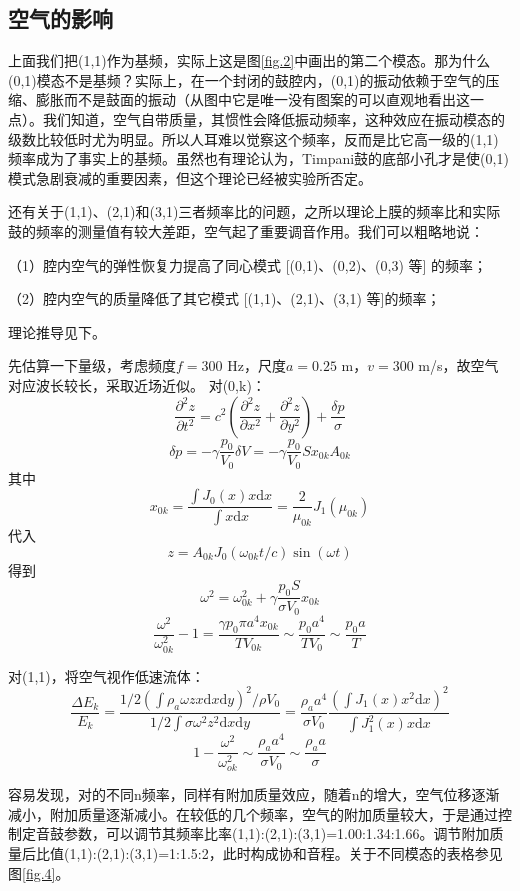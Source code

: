 \subsection{空气的影响}
上面我们把(1,1)作为基频，实际上这是图\ref{fig.2}中画出的第二个模态。那为什么(0,1)模态不是基频？实际上，在一个封闭的鼓腔内，(0,1)的振动依赖于空气的压缩、膨胀而不是鼓面的振动（从图中它是唯一没有图案的可以直观地看出这一点）。我们知道，空气自带质量，其惯性会降低振动频率，这种效应在振动模态的级数比较低时尤为明显。所以人耳难以觉察这个频率，反而是比它高一级的(1,1)频率成为了事实上的基频。虽然也有理论认为，Timpani鼓的底部小孔才是使(0,1)模式急剧衰减的重要因素，但这个理论已经被实验所否定。

还有关于(1,1)、(2,1)和(3,1)三者频率比的问题，之所以理论上膜的频率比和实际鼓的频率的测量值有较大差距，空气起了重要调音作用。我们可以粗略地说：

（1）腔内空气的弹性恢复力提高了同心模式 [(0,1)、(0,2)、(0,3) 等] 的频率；

（2）腔内空气的质量降低了其它模式 [(1,1)、(2,1)、(3,1) 等]的频率；

理论推导见下。

先估算一下量级，考虑频度$f=300$ Hz，尺度$a=0.25$ m，$v=300$ m/s，故空气对应波长较长，采取近场近似。
对(0,k)：
$$\frac{\partial^2 z}{\partial t^2}=c^2\left(\frac{\partial^2 z}{\partial x^2}+\frac{\partial^2 z}{\partial y^2}\right)+\frac{\delta p}{\sigma}$$
$$\delta p=-\gamma \frac{p_0}{V_0} \delta V=-\gamma \frac{p_0}{V_0} S x_{0 k} A_{0 k}$$
其中
$$x_{0 k}=\frac{\int J_0(x) x\text{d}x}{\int x\text{d}x}=\frac{2}{\mu_{0 k}} J_1\left(\mu_{0 k}\right)$$
代入
$$z=A_{0 k} J_0\left(\omega_{0 k} t / c\right) \sin (\omega t)$$
得到
$$\omega^2=\omega_{0 k}^2+\gamma \frac{p_0 S}{\sigma V_0} x_{0 k}$$
$$\frac{\omega^2}{\omega_{0 k}^2}-1=\frac{\gamma p_0  \pi a^4 x_{0 k}}{T V_{0 k}} \sim \frac{p_0 a^4}{T V_0} \sim \frac{p_0 a}{T}$$

对(1,1)，将空气视作低速流体：
$$\frac{\Delta E_k}{E_k}=\frac{1 / 2\left(\int \rho_a \omega z x \text{d}x\text{d}y\right)^2 / \rho V_0}{1 / 2 \int \sigma \omega^2 z^2\text{d}x\text{d}y}=\frac{\rho_a a^4}{\sigma V_0} \frac{\left(\int J_1(x) x^2 \text{d}x\right)^2}{\int J_1^2(x)x\text{d}x}$$
$$1-\frac{\omega^2}{\omega_{o k}^2} \sim \frac{\rho_a a^4}{\sigma V_0} \sim \frac{\rho_a a}{\sigma}$$

容易发现，对的不同n频率，同样有附加质量效应，随着n的增大，空气位移逐渐减小，附加质量逐渐减小。在较低的几个频率，空气的附加质量较大，于是通过控制定音鼓参数，可以调节其频率比率(1,1):(2,1):(3,1)=1.00:1.34:1.66。调节附加质量后比值(1,1):(2,1):(3,1)=1:1.5:2，此时构成协和音程。关于不同模态的表格参见图\ref{fig.4}。

